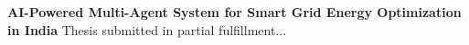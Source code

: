 \begin{titlepage}
\centering
\vspace*{3cm}
\Huge\textbf{AI-Powered Multi-Agent System for Smart Grid Energy Optimization in India}
\vspace{2cm}
\Large Thesis submitted in partial fulfillment...
\end{titlepage}
